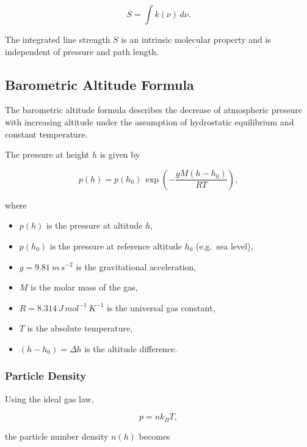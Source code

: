 \begin{equation}
S = \int k(\nu)\, d\nu.
\end{equation}

The integrated line strength $S$ is an intrinsic molecular property and
is independent of pressure and path length.


\subsection{Barometric Altitude Formula}

The barometric altitude formula describes the decrease of atmospheric
pressure with increasing altitude under the assumption of hydrostatic
equilibrium and constant temperature.

The pressure at height $h$ is given by

\begin{equation}
p(h) = p(h_0)\,
\exp\left(-\frac{g M (h - h_0)}{R T}\right),
\label{equation: Pressure with altitude}
\end{equation}

where

\begin{itemize}
    \item $p(h)$ is the pressure at altitude $h$,
    \item $p(h_0)$ is the pressure at reference altitude $h_0$
          (e.g.\ sea level),
    \item $g = \SI{9.81}{m\,s^{-2}}$ is the gravitational acceleration,
    \item $M$ is the molar mass of the gas,
    \item $R = \SI{8.314}{J\,mol^{-1}\,K^{-1}}$ is the universal gas constant,
    \item $T$ is the absolute temperature,
    \item $(h - h_0) = \Delta h$ is the altitude difference.
\end{itemize}

\subsubsection*{Particle Density}

Using the ideal gas law,

\begin{equation}
    p = n k_B T,
\end{equation}


the particle number density $n(h)$ becomes

